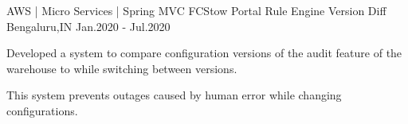 \begin{cventries}

\cventry
{AWS | Micro Services | Spring MVC} %
{FCStow Portal Rule Engine Version Diff} %
{Bengaluru,IN} %
{Jan.2020 - Jul.2020} %
{ %
\begin{cvitems}
\item {Developed a system to compare configuration versions of the audit feature of the warehouse to while switching between versions.}
\item {This system prevents outages caused by human error while changing configurations.}
\end{cvitems}
}






\end{cventries}
